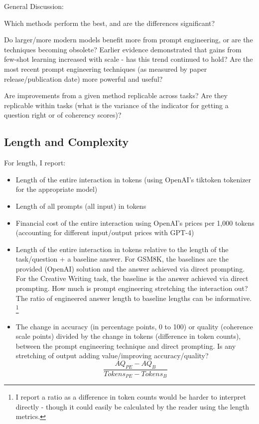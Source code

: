 \documentclass[11pt]{article}
\begin{document}
\begin{centering}
  \clearpage

  \twocolumn

\end{centering}

General Discussion:

Which methods perform the best, and are the differences significant?

Do larger/more modern models benefit more from prompt engineering, or are the techniques becoming obsolete? Earlier evidence demonstrated that gains from few-shot learning increased with scale - has this trend continued to hold? \cite{brown_language_2020} Are the most recent prompt engineering techniques (as measured by paper release/publication date) more powerful and useful?

Are improvements from a given method replicable across tasks? Are they replicable within tasks (what is the variance of the indicator for getting a question right or of coherency scores)?

\subsection*{Length and Complexity}

For length, I report:

\begin{itemize}
  \item Length of the entire interaction in tokens (using OpenAI's tiktoken tokenizer for the appropriate model)
  \item Length of all prompts (all input) in tokens
  \item Financial cost of the entire interaction using OpenAI's prices per 1,000 tokens (accounting for different input/output prices with GPT-4)
  \item Length of the entire interaction in tokens relative to the length of the task/question + a baseline answer. For GSM8K, the baselines are the provided (OpenAI) solution and the answer achieved via direct prompting. For the Creative Writing task, the baseline is the answer achieved via direct prompting. How much is prompt engineering stretching the interaction out? The ratio of engineered answer length to baseline lengths can be informative. \footnote{I report a ratio as a difference in token counts would be harder to interpret directly - though it could easily be calculated by the reader using the length metrics.}
  \item The change in accuracy (in percentage points, 0 to 100) or quality (coherence scale points) divided by the change in tokens (difference in token counts), between the prompt engineering technique and direct prompting. Is any stretching of output adding value/improving accuracy/quality?
  \begin{displaymath}
    \frac{AQ_{PE} - AQ_{B}}{Tokens_{PE} - Tokens_{B}}
  \end{displaymath}
\end{itemize}
\end{document}
